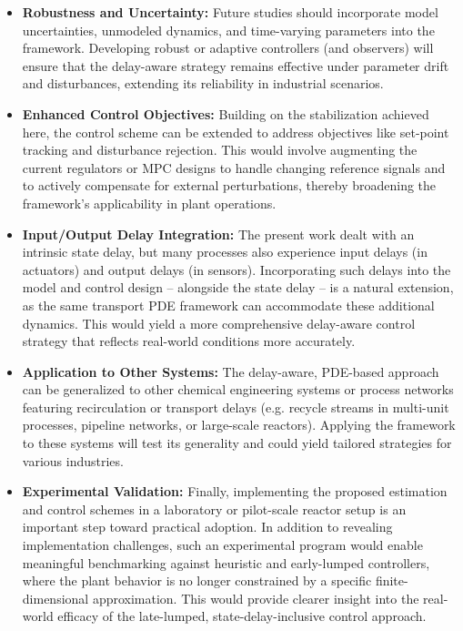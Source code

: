 		\begin{itemize}
			\item \textbf{Robustness and Uncertainty:} Future studies should incorporate model uncertainties, unmodeled dynamics, and time-varying parameters into the framework. Developing robust or adaptive controllers (and observers) will ensure that the delay-aware strategy remains effective under parameter drift and disturbances, extending its reliability in industrial scenarios.
			\item \textbf{Enhanced Control Objectives:} Building on the stabilization achieved here, the control scheme can be extended to address objectives like set-point tracking and disturbance rejection. This would involve augmenting the current regulators or MPC designs to handle changing reference signals and to actively compensate for external perturbations, thereby broadening the framework’s applicability in plant operations.
			\item \textbf{Input/Output Delay Integration:} The present work dealt with an intrinsic state delay, but many processes also experience input delays (in actuators) and output delays (in sensors). Incorporating such delays into the model and control design – alongside the state delay – is a natural extension, as the same transport PDE framework can accommodate these additional dynamics. This would yield a more comprehensive delay-aware control strategy that reflects real-world conditions more accurately.
			\item \textbf{Application to Other Systems:} The delay-aware, PDE-based approach can be generalized to other chemical engineering systems or process networks featuring recirculation or transport delays (e.g. recycle streams in multi-unit processes, pipeline networks, or large-scale reactors). Applying the framework to these systems will test its generality and could yield tailored strategies for various industries.
			\item \textbf{Experimental Validation:} Finally, implementing the proposed estimation and control schemes in a laboratory or pilot-scale reactor setup is an important step toward practical adoption. In addition to revealing implementation challenges, such an experimental program would enable meaningful benchmarking against heuristic and early-lumped controllers, where the plant behavior is no longer constrained by a specific finite-dimensional approximation. This would provide clearer insight into the real-world efficacy of the late-lumped, state-delay-inclusive control approach.
		\end{itemize}
